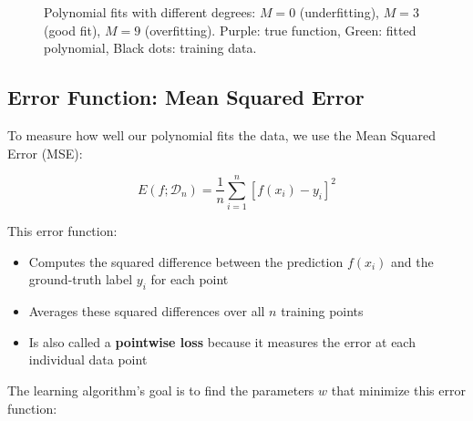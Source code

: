 \documentclass[11pt,a4paper]{article}
\theoremstyle{definition}
\theoremstyle{plain}
\theoremstyle{remark}
\begin{document}
\begin{figure}[h]
\caption{Polynomial fits with different degrees: $M=0$ (underfitting), $M=3$ (good fit), $M=9$ (overfitting). Purple: true function, Green: fitted polynomial, Black dots: training data.}
\end{figure}

\subsection{Error Function: Mean Squared Error}

To measure how well our polynomial fits the data, we use the Mean Squared Error (MSE):

\[
E(f; \mathcal{D}_n) = \frac{1}{n} \sum_{i=1}^{n} [f(x_i) - y_i]^2
\]

This error function:
\begin{itemize}
    \item Computes the squared difference between the prediction $f(x_i)$ and the ground-truth label $y_i$ for each point
    \item Averages these squared differences over all $n$ training points
    \item Is also called a \textbf{pointwise loss} because it measures the error at each individual data point
\end{itemize}

The learning algorithm's goal is to find the parameters $w$ that minimize this error function:
\end{document}
